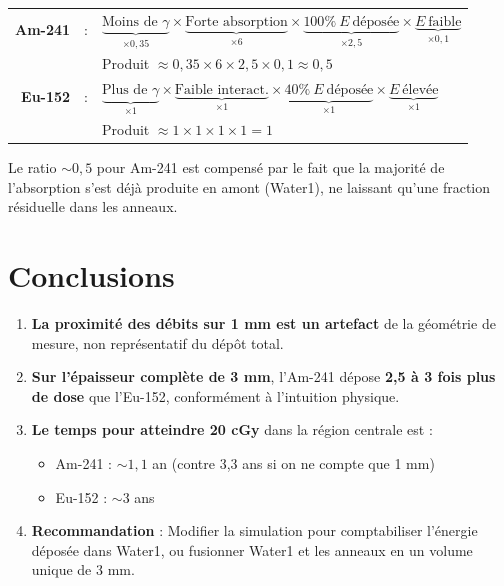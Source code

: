 \documentclass[11pt,a4paper]{article}
\begin{document}
\begin{center}
\renewcommand{\arraystretch}{1.4}
\begin{tabular}{rcl}
\textbf{Am-241} & : & $\underbrace{\text{Moins de } \gamma}_{\times 0{,}35} \times \underbrace{\text{Forte absorption}}_{\times 6} \times \underbrace{100\%~E~\text{déposée}}_{\times 2{,}5} \times \underbrace{E~\text{faible}}_{\times 0{,}1}$ \\[0.2cm]
& & Produit $\approx 0{,}35 \times 6 \times 2{,}5 \times 0{,}1 \approx 0{,}5$ \\[0.3cm]
\textbf{Eu-152} & : & $\underbrace{\text{Plus de } \gamma}_{\times 1} \times \underbrace{\text{Faible interact.}}_{\times 1} \times \underbrace{40\%~E~\text{déposée}}_{\times 1} \times \underbrace{E~\text{élevée}}_{\times 1}$ \\[0.2cm]
& & Produit $\approx 1 \times 1 \times 1 \times 1 = 1$ \\
\end{tabular}
\end{center}

Le ratio $\sim 0{,}5$ pour Am-241 est compensé par le fait que la majorité de l'absorption s'est déjà produite en amont (Water1), ne laissant qu'une fraction résiduelle dans les anneaux.

\section{Conclusions}

\begin{conclusion}
\begin{enumerate}
    \item \textbf{La proximité des débits sur 1 mm est un artefact} de la géométrie de mesure, non représentatif du dépôt total.
    
    \item \textbf{Sur l'épaisseur complète de 3 mm}, l'Am-241 dépose \textbf{2,5 à 3 fois plus de dose} que l'Eu-152, conformément à l'intuition physique.
    
    \item \textbf{Le temps pour atteindre 20 cGy} dans la région centrale est :
    \begin{itemize}
        \item Am-241 : $\sim 1{,}1$ an (contre 3,3 ans si on ne compte que 1 mm)
        \item Eu-152 : $\sim 3$ ans
    \end{itemize}
    
    \item \textbf{Recommandation} : Modifier la simulation pour comptabiliser l'énergie déposée dans Water1, ou fusionner Water1 et les anneaux en un volume unique de 3 mm.
\end{enumerate}
\end{conclusion}
\end{document}
